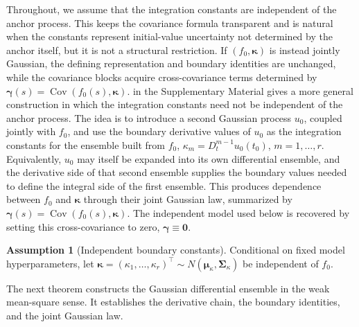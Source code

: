 \documentclass[11pt,a4paper]{article}
\theoremstyle{definition}
\newtheorem{assumption}{Assumption}
\theoremstyle{remark}
\DeclareMathOperator{\Cov}{Cov}
\begin{document}
Throughout, we assume that the integration constants are independent of the anchor process. This keeps the covariance formula transparent and is natural when the constants represent initial-value uncertainty not determined by the anchor itself, but it is not a structural restriction. If \((f_0,\boldsymbol{\kappa})\) is instead jointly Gaussian, the defining representation and boundary identities are unchanged, while the covariance blocks acquire cross-covariance terms determined by \(\boldsymbol{\gamma}(s)=\Cov(f_0(s),\boldsymbol{\kappa})\).  in the Supplementary Material gives a more general construction in which the integration constants need not be independent of the anchor process. The idea is to introduce a second Gaussian process \(u_0\), coupled jointly with \(f_0\), and use the boundary derivative values of \(u_0\) as the integration constants for the ensemble built from \(f_0\), $\kappa_m = D_t^{m-1}u_0(t_0)$, $m=1,\ldots,r$. Equivalently, \(u_0\) may itself be expanded into its own differential ensemble, and the derivative side of that second ensemble supplies the boundary values needed to define the integral side of the first ensemble. This produces dependence between \(f_0\) and \(\boldsymbol{\kappa}\) through their joint Gaussian law, summarized by \(\boldsymbol{\gamma}(s)=\Cov(f_0(s),\boldsymbol{\kappa})\). The independent model used below is recovered by setting this cross-covariance to zero, \(\boldsymbol{\gamma}\equiv\mathbf 0\).

\begin{assumption}[Independent boundary constants]\label{ass:independent-boundary}
Conditional on fixed model hyperparameters, let $\boldsymbol\kappa=(\kappa_1,\dots,\kappa_r)^{\top}
\sim N(\boldsymbol\mu_\kappa,\boldsymbol\Sigma_\kappa)$ be independent of $f_0$.\end{assumption}

The next theorem constructs the Gaussian differential ensemble in the weak mean-square sense. It establishes the derivative chain, the boundary identities, and the joint Gaussian law.
\end{document}
